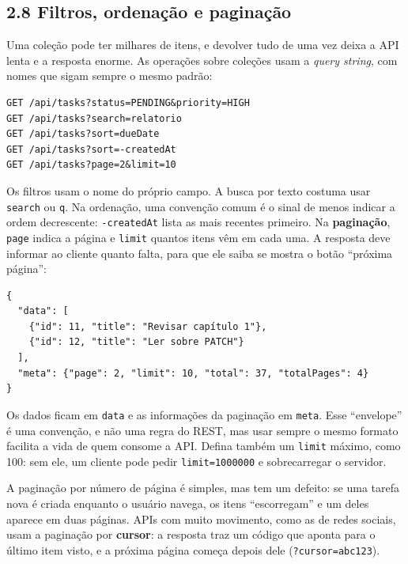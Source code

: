 \subsection{2.8 Filtros, ordenação e paginação}

Uma coleção pode ter milhares de itens, e devolver tudo de uma vez deixa a API lenta e a resposta enorme. As operações sobre coleções usam a \textit{query string}, com nomes que sigam sempre o mesmo padrão:

\begin{codigo}
\begin{Verbatim}[breaklines=true, breaksymbolleft={}, fontsize=\footnotesize]
GET /api/tasks?status=PENDING&priority=HIGH
GET /api/tasks?search=relatorio
GET /api/tasks?sort=dueDate
GET /api/tasks?sort=-createdAt
GET /api/tasks?page=2&limit=10
\end{Verbatim}
\end{codigo}

Os filtros usam o nome do próprio campo. A busca por texto costuma usar \texttt{search} ou \texttt{q}. Na ordenação, uma convenção comum é o sinal de menos indicar a ordem decrescente: \texttt{-createdAt} lista as mais recentes primeiro. Na \textbf{paginação}, \texttt{page} indica a página e \texttt{limit} quantos itens vêm em cada uma. A resposta deve informar ao cliente quanto falta, para que ele saiba se mostra o botão ``próxima página'':

\begin{codigo}
\begin{Verbatim}[breaklines=true, breaksymbolleft={}, fontsize=\footnotesize]
{
  "data": [
    {"id": 11, "title": "Revisar capítulo 1"},
    {"id": 12, "title": "Ler sobre PATCH"}
  ],
  "meta": {"page": 2, "limit": 10, "total": 37, "totalPages": 4}
}
\end{Verbatim}
\end{codigo}

Os dados ficam em \texttt{data} e as informações da paginação em \texttt{meta}. Esse ``envelope'' é uma convenção, e não uma regra do REST, mas usar sempre o mesmo formato facilita a vida de quem consome a API. Defina também um \texttt{limit} máximo, como 100: sem ele, um cliente pode pedir \texttt{limit=1000000} e sobrecarregar o servidor.

A paginação por número de página é simples, mas tem um defeito: se uma tarefa nova é criada enquanto o usuário navega, os itens ``escorregam'' e um deles aparece em duas páginas. APIs com muito movimento, como as de redes sociais, usam a paginação por \textbf{cursor}: a resposta traz um código que aponta para o último item visto, e a próxima página começa depois dele (\texttt{?cursor=abc123}).

